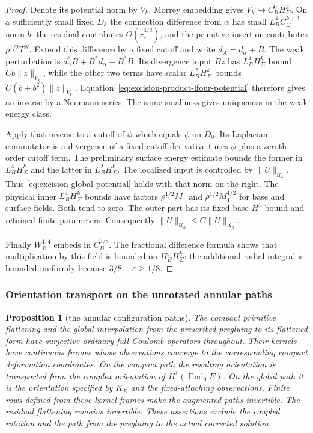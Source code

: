 \documentclass[11pt]{amsart}
\newtheorem{proposition}[theorem]{Proposition}
\theoremstyle{definition}
\theoremstyle{remark}
\theoremstyle{plain}
\newcommand{\End}{\operatorname{End}}
\begin{document}
\begin{proof}
Denote its potential norm by $V_k$. Morrey embedding gives
$V_k\hookrightarrow C^0_BH^k_\Sigma$.
On a sufficiently small fixed $D_3$ the connection difference
from $\alpha$ has small $L^4_BC^{k+2}_\Sigma$ norm $b$:
the residual contributes $O(r_*^{3/2})$, and the primitive
insertion contributes $\rho^{1/2}T^N$.
Extend this difference by a fixed cutoff and write
$d_A=d_\alpha+B$. The weak perturbation is
$d_\alpha^*B+B^*d_\alpha+B^*B$.
Its divergence input $Bz$ has $L^4_BH^k_\Sigma$ bound
$Cb\|z\|_{V_k}$, while the other two terms have scalar
$L^2_BH^k_\Sigma$ bounds $C(b+b^2)\|z\|_{V_k}$.
Equation~\eqref{eq:excision-product-lfour-potential} therefore
gives an inverse by a Neumann series.
The same smallness gives uniqueness in the weak energy class.

Apply that inverse to a cutoff of $\phi$ which equals $\phi$
on $D_0$. Its Laplacian commutator is a divergence of a fixed
cutoff derivative times $\phi$ plus a zeroth-order cutoff term.
The preliminary surface energy estimate bounds the former in
$L^4_BH^k_\Sigma$ and the latter in $L^2_BH^k_\Sigma$.
The localized input is controlled by $\|U\|_{\mathcal U_k}$.
Thus \eqref{eq:excision-global-potential} holds with that
norm on the right.
The physical inner $L^4_BH^k_\Sigma$ bounds have factors
$\rho^{1/2}M_1$ and $\rho^{1/2}M_1^{1/2}$ for base and
surface fields. Both tend to zero. The outer part has its
fixed base $H^1$ bound and retained finite parameters.
Consequently $\|U\|_{\mathcal U_k}\leq C\|U\|_{X_\rho}$.

Finally $W^{1,4}_B$ embeds in $C^{3/8}_B$.
The fractional difference formula shows that multiplication
by this field is bounded on $H^\varepsilon_BH^k_\Sigma$:
the additional radial integral is bounded uniformly because
$3/8-\varepsilon\geq1/8$.
\end{proof}

\subsubsection{Orientation transport on the unrotated annular paths}

\begin{proposition}[the annular configuration paths]
\label{prop:excision-unrotated-annular-orientations}
The compact primitive flattening and the global interpolation
from the prescribed pregluing to its flattened form have
surjective ordinary full-Coulomb operators throughout.
Their kernels have continuous frames whose observations converge
to the corresponding compact deformation coordinates.
On the compact path the resulting orientation is transported
from the complex orientation of $H^1(\End_0E)$.
On the global path it is the orientation specified by $K_E$
and the fixed-attaching observations. Finite rows defined from
these kernel frames make the augmented paths invertible.
The residual flattening remains invertible.
These assertions exclude the coupled rotation and the path
from the pregluing to the actual corrected solution.
\end{proposition}
\end{document}
